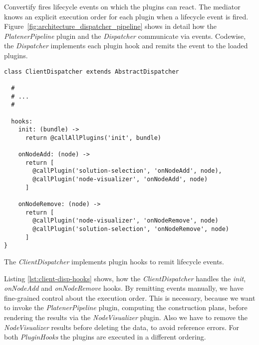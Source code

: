 \documentclass[../ClassicThesis.tex]{subfiles}
\begin{document}
Convertify fires lifecycle events on which the plugins can react. The mediator
knows an explicit execution order for each plugin when a lifecycle event is
fired. Figure~\ref{fig:architecture_dispatcher_pipeline} shows in detail how the
\emph{PlatenerPipeline} plugin and the \emph{Dispatcher} communicate via events.
Codewise, the \emph{Dispatcher} implements each plugin hook and remits the event
to the loaded plugins.

\begin{listing}[!h]
\centering
\begin{verbatim}
class ClientDispatcher extends AbstractDispatcher

  #
  # ...
  #

  hooks:
    init: (bundle) ->
      return @callAllPlugins('init', bundle)

    onNodeAdd: (node) ->
      return [
        @callPlugin('solution-selection', 'onNodeAdd', node),
        @callPlugin('node-visualizer', 'onNodeAdd', node)
      ]

    onNodeRemove: (node) ->
      return [
        @callPlugin('node-visualizer', 'onNodeRemove', node)
        @callPlugin('solution-selection', 'onNodeRemove', node)
      ]
}
\end{verbatim}
\caption{The \emph{ClientDispatcher} implements plugin hooks to remit lifecycle events.}
\label{lst:client-disp-hooks}
\end{listing}

Listing \ref{lst:client-disp-hooks} shows, how the \emph{ClientDispatcher}
 handles the \textit{init},
\textit{onNodeAdd} and \textit{onNodeRemove} hooks. By remitting events manually, we have fine-grained
control about the execution order. This is necessary, because we want to invoke
the \emph{PlatenerPipeline} plugin, computing the construction plans, before
rendering the results via the \emph{NodeVisualizer} plugin. Also we have to
remove the \emph{NodeVisualizer} results before deleting the data, to avoid
reference errors. For both \emph{PluginHooks} the plugins are executed in a
different ordering.

\end{document}
